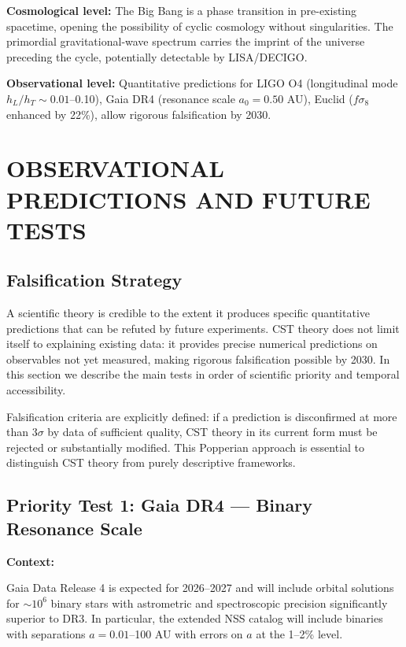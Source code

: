 \documentclass[11pt,a4paper]{article}
\begin{document}
\textbf{Cosmological level:} The Big Bang is a phase transition in
pre-existing spacetime, opening the possibility of cyclic cosmology
without singularities. The primordial gravitational-wave spectrum
carries the imprint of the universe preceding the cycle, potentially
detectable by LISA/DECIGO.

\textbf{Observational level:} Quantitative predictions for LIGO O4
(longitudinal mode \(h_L/h_T \sim 0.01\)--0.10), Gaia DR4 (resonance
scale \(a_0 = 0.50\) AU), Euclid (\(f\sigma_8\) enhanced by 22\%), allow
rigorous falsification by 2030.

\hypertarget{observational-predictions-and-future-tests}{%
\section{OBSERVATIONAL PREDICTIONS AND FUTURE
TESTS}\label{observational-predictions-and-future-tests}}

\hypertarget{falsification-strategy}{%
\subsection{Falsification
Strategy}\label{falsification-strategy}}

A scientific theory is credible to the extent it produces specific
quantitative predictions that can be refuted by future experiments. CST
theory does not limit itself to explaining existing data: it provides
precise numerical predictions on observables not yet measured, making
rigorous falsification possible by 2030. In this section we describe the
main tests in order of scientific priority and temporal accessibility.

Falsification criteria are explicitly defined: if a prediction is
disconfirmed at more than \(3\sigma\) by data of sufficient quality, CST
theory in its current form must be rejected or substantially modified.
This Popperian approach is essential to distinguish CST theory from
purely descriptive frameworks.

\hypertarget{priority-test-1-gaia-dr4-binary-resonance-scale}{%
\subsection{Priority Test 1: Gaia DR4 --- Binary Resonance
Scale}\label{priority-test-1-gaia-dr4-binary-resonance-scale}}

\textbf{Context:}

Gaia Data Release 4 is expected for 2026--2027 and will include orbital
solutions for \(\sim 10^6\) binary stars with astrometric and
spectroscopic precision significantly superior to DR3. In particular,
the extended NSS catalog will include binaries with separations
\(a = 0.01\)--100 AU with errors on \(a\) at the 1--2\% level.
\end{document}
